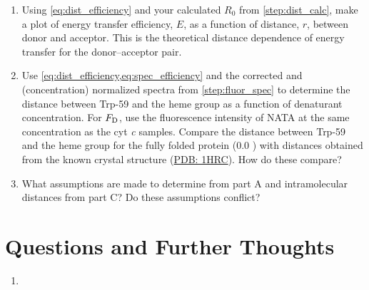\documentclass[nobib,nofonts,nols,nohyper]{tufte-handout}
\begin{document}
\begin{enumerate}
	\label{step:dist_calc}
	\item Using \cref{eq:dist_efficiency} and your calculated \( R_0 \) from \cref{step:dist_calc}, make a plot of energy transfer efficiency, \( E \), as a function of distance, \( r \), between donor and acceptor. 
	This is the theoretical distance dependence of energy transfer for the donor--acceptor pair. 
	\item Use \cref{eq:dist_efficiency,eq:spec_efficiency} and the corrected and (concentration) normalized spectra from \cref{step:fluor_spec} to determine the distance between Trp-59 and the heme group as a function of denaturant concentration. 
	For \( F_{\textnormal{D}} \), use the fluorescence intensity of NATA at the same concentration as the cyt \emph{c} samples. 
	Compare the distance between Trp-59 and the heme group for the fully folded protein (\qty{0.0}{\Molar} ) with distances obtained from the known crystal structure (\href{https://www.rcsb.org/structure/1hrc}{PDB: 1HRC}). 
	How do these compare?
	\item What assumptions are made to determine \gibbs*[subscript-right=\ch{H2O}]{} from part A and intramolecular distances from part C\@? 
	Do these assumptions conflict?
\end{enumerate}


\section{Questions and Further Thoughts} %
\label{sec:questions_and_further_thoughts}

\begin{enumerate}
	\item 
\end{enumerate}


\nocite{*}
\printbibliography[category=cited]%

\printbibliography[%
  title={Further Reading},%
  resetnumbers,%
  omitnumbers,%
	notcategory=cited,%
	]
\end{document}
